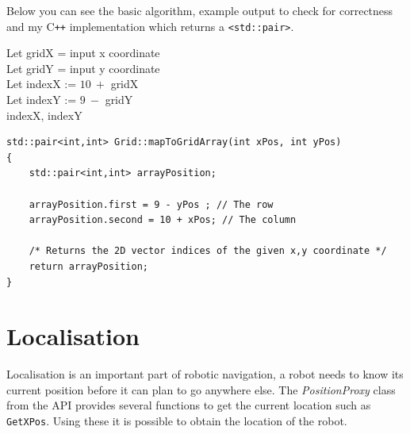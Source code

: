 \documentclass[a4paper,12pt]{article}
\begin{document}
Below you can see the basic algorithm, example output to check for correctness and my C\texttt{++} implementation which returns a \texttt{<std::pair>}.

\begin{mdframed}
    \begin{minipage}[t]{.5\textwidth}
            \vspace{0.2cm}
        \small
        \begin{algorithm}[H]
            \DontPrintSemicolon
            \SetAlgoLined
                \hspace{0.6cm}Let gridX = input x coordinate\\
                \hspace{0.5cm} Let gridY = input y coordinate\\
                \vspace{0.3cm}
                \hspace{0.5cm} Let indexX := $10\:+$ gridX\\
                \hspace{0.5cm} Let indexY := $9\:-$ gridY\\
                \vspace{0.3cm}
                \hspace{0.6cm}\Return indexX, indexY\;
        \end{algorithm}
        \normalsize
    \end{minipage}
    \begin{minipage}[t]{.5\textwidth}
            \small
            \vspace{0.2cm}
            
            \normalsize
    \end{minipage}
\end{mdframed}

\begin{lstlisting}
std::pair<int,int> Grid::mapToGridArray(int xPos, int yPos)
{
    std::pair<int,int> arrayPosition;

    arrayPosition.first = 9 - yPos ; // The row
    arrayPosition.second = 10 + xPos; // The column

    /* Returns the 2D vector indices of the given x,y coordinate */
    return arrayPosition; 
}
\end{lstlisting}
\section{Localisation}
Localisation is an important part of robotic navigation, a robot needs to know its current position before it can plan to go anywhere else. The \textit{PositionProxy} class from the API provides several functions to get the current location such as \texttt{GetXPos}. Using these it is possible to obtain the location of the robot.
\end{document}
